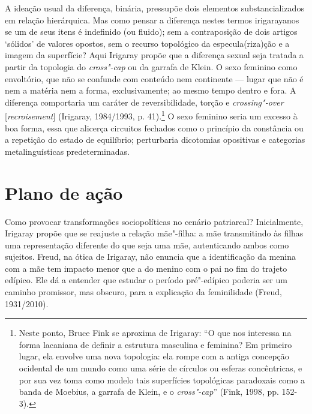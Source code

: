 A ideação usual da diferença, binária, pressupõe dois elementos
substancializados em relação hierárquica. Mas como pensar a diferença
nestes termos irigarayanos se um de seus itens é indefinido (ou fluido);
sem a contraposição de dois artigos `sólidos' de valores opostos, sem o
recurso topológico da especula(riza)ção e a imagem da superfície? Aqui
Irigaray propõe que a diferença sexual seja tratada a partir da
topologia do \emph{cross"-cap} ou da garrafa de Klein. O sexo feminino
como envoltório, que não se confunde com conteúdo nem continente ---
lugar que não é nem a matéria nem a forma, exclusivamente; ao mesmo
tempo dentro e fora. A diferença comportaria um caráter de
reversibilidade, torção e \emph{crossing"-over} {[}\emph{recroisement}{]}
(Irigaray, 1984/1993, p. 41).\footnote{Neste ponto, Bruce Fink se
  aproxima de Irigaray: ``O que nos interessa na forma lacaniana de
  definir a estrutura masculina e feminina? Em primeiro lugar, ela
  envolve uma nova topologia: ela rompe com a antiga concepção ocidental
  de um mundo como uma série de círculos ou esferas concêntricas, e por
  sua vez toma como modelo tais superfícies topológicas paradoxais como
  a banda de Moebius, a garrafa de Klein, e o \emph{cross"-cap}'' (Fink,
  1998, pp. 152-3).} O sexo feminino seria um excesso à boa forma, essa
que alicerça circuitos fechados como o princípio da constância ou a
repetição do estado de equilíbrio; perturbaria dicotomias opositivas e
categorias metalinguísticas predeterminadas.

\section{Plano de ação}

Como provocar transformações sociopolíticas no cenário patriarcal?
Inicialmente, Irigaray propõe que se reajuste a relação mãe"-filha: a mãe
transmitindo às filhas uma representação diferente do que seja uma mãe,
autenticando ambos como sujeitos. Freud, na ótica de Irigaray, não
enuncia que a identificação da menina com a mãe tem impacto menor que a
do menino com o pai no fim do trajeto edípico. Ele dá a entender que
estudar o período pré"-edípico poderia ser um caminho promissor, mas
obscuro, para a explicação da feminilidade (Freud, 1931/2010).

